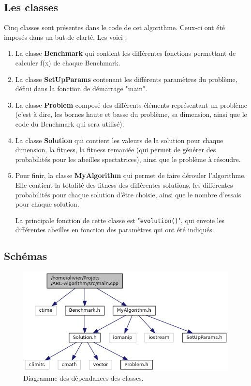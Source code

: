 \documentclass[a4paper, fontsize=11pt]{article}
\begin{document}
\subsection{Les classes}
Cinq classes sont présentes dans le code de cet algorithme. Ceux-ci ont été imposés dans un but de clarté. Les voici :
\begin{enumerate}
\item La classe \textbf{Benchmark} qui contient les différentes fonctions permettant de calculer f(x) de chaque Benchmark.

\item La classe \textbf{SetUpParams} contenant les différents paramètres du problème, défini dans la fonction de démarrage "main".

\item La classe \textbf{Problem} composé des différents éléments représentant un problème (c'est à dire, les bornes haute et basse du problème, sa dimension, ainsi que le code du Benchmark qui sera utilisé).

\item La classe \textbf{Solution} qui contient les valeurs de la solution pour chaque dimension, la fitness, la fitness remaniée (qui permet de générer des probabilités pour les abeilles spectatrices), ainsi que le problème à résoudre.

\item Pour finir, la classe \textbf{MyAlgorithm} qui permet de faire dérouler l'algorithme. Elle contient la totalité des fitness des différentes solutions, les différentes probabilités pour chaque solution d'être choisie, ainsi que le nombre d'essais pour chaque solution.

La principale fonction de cette classe est "\texttt{evolution()}", qui envoie les différentes abeilles en fonction des paramètres qui ont été indiqués.
\end{enumerate} 

\subsection{Schémas}
\begin{figure}[h]
\centering
\includegraphics[width=1\textwidth]{diagram.png}
\caption{\label{fig:frog}Diagramme des dépendances des classes.}
\end{figure}
\end{document}
